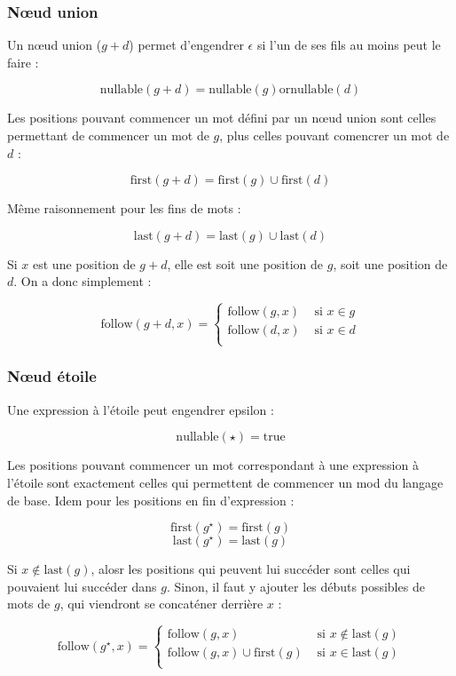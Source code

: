 \documentclass{article}
\begin{document}
\subsubsection{N\oe ud union}

Un n\oe ud union ($g+d$) permet d'engendrer $\epsilon$ si l'un de ses fils au moins peut le faire : 


$$\mbox{nullable}(g + d)=\mbox{nullable}(g) \mbox{or} \mbox{nullable}(d)$$


Les positions pouvant commencer un mot défini par un n\oe ud union sont celles permettant de commencer un mot de $g$, plus celles pouvant comencrer un mot de $d$ : 

$$\mbox{first}(g + d)=\mbox{first}(g) \cup \mbox{first}(d)$$ 

Même raisonnement pour les fins de mots  : 

$$\mbox{last}(g + d)=\mbox{last}(g) \cup \mbox{last}(d)$$ 

Si $x$ est une position de $g + d$, elle est soit une position de $g$, soit une position de $d$. On a donc simplement : 


$$\mbox{follow}(g +d,x)=\left\{
\begin{array}{ll}
\mbox{follow}(g,x)&  \mbox{ si }x \in g\\
\mbox{follow}(d,x)& \mbox{ si } x \in d\\
\end{array}
\right.$$

\subsubsection{N\oe ud étoile}

Une expression à l'étoile peut engendrer epsilon : 

$$\mbox{nullable}(\star)=\mbox{true}$$

Les positions pouvant commencer un mot correspondant à une expression à l'étoile sont exactement celles qui permettent de commencer un mod du langage de base. Idem pour les positions en fin d'expression : 

$$\mbox{first}(g^\star)=\mbox{first}(g)$$
$$\mbox{last}(g^\star)=\mbox{last}(g)$$

Si $x \not\in \mbox{last}(g)$, alosr les positions qui peuvent lui succéder sont celles qui pouvaient lui succéder dans $g$.
Sinon, il faut y ajouter les débuts possibles de mots de $g$, qui viendront se concaténer derrière $x$ : 

$$\mbox{follow}(g^\star,x)=\left\{
\begin{array}{ll}
\mbox{follow}(g,x)& \mbox{ si } x \not\in \mbox{last}(g) \\
\mbox{follow}(g,x)\cup \mbox{first}(g)& \mbox{ si } x \in \mbox{last}(g) \\
\end{array}
\right.
$$
\end{document}
